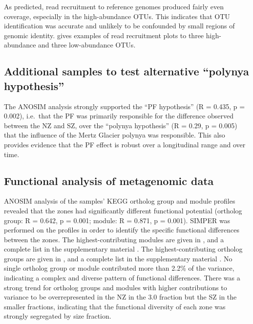 As predicted, read recruitment to reference genomes produced fairly even coverage, especially in the high-abundance \acp{OTU}.
This indicates that \ac{OTU} identification was accurate and unlikely to be confounded by small regions of genomic identity.
 gives examples of read recruitment plots to three high-abundance and three  low-abundance \acp{OTU}.



\subsection{Additional samples to test alternative ``polynya hypothesis''}
The \ac{ANOSIM} analysis strongly supported the ``\ac{PF} hypothesis'' (R = 0.435, p = 0.002), i.e.\ that the \ac{PF} was primarily responsible for the difference observed between the \ac{NZ} and \ac{SZ}, over the ``polynya hypothesis'' (R = 0.29, p = 0.005) that the influence of the Mertz Glacier polynya was responsible.
This also provides evidence that the \ac{PF} effect is robust over a longitudinal range and over time.

\subsection{Functional analysis of metagenomic data}

\ac{ANOSIM} analysis of the samples' \ac{KEGG} ortholog group and module profiles revealed that the zones had significantly different functional potential (ortholog group: R = 0.642, p = 0.001; module: R = 0.871, p = 0.001). 
\ac{SIMPER} was performed on the profiles in order to identify the specific functional differences between the zones. 
The highest-contributing modules are given in , and a complete list in the supplementary material .
The highest-contributing ortholog groups are given in , and a complete list in the supplementary material .
No single ortholog group or module contributed more than 2.2\% of the variance, indicating a complex and diverse pattern of functional differences. 
There was a strong trend for ortholog groups and modules with higher contributions to variance to be overrepresented in the \ac{NZ} in the 3.0 \micron{} fraction but the \ac{SZ} in the smaller fractions, indicating that the functional diversity of each zone was strongly segregated by size fraction.

